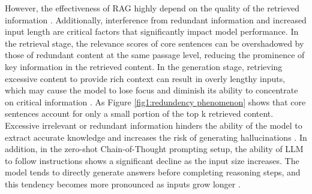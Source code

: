 However, the effectiveness of RAG highly depend on the quality of the retrieved information \cite{fan2024survey}. Additionally, interference from redundant information and increased input length are critical factors that significantly impact model performance.
In the retrieval stage, the relevance scores of core sentences can be overshadowed by those of redundant content at the same passage level, reducing the prominence of key information in the retrieved content. In the generation stage, retrieving excessive content to provide rich context can result in overly lengthy inputs, which may cause the model to lose focus and diminish its ability to concentrate on critical information \cite{jin2024longcontextllmsmeetrag, largelanguagemodelsCanbeEasilyDistractedbyInrelevantContext}. As Figure \ref{fig1:redundency phenomenon} shows that core sentences account for only a small portion of the top k retrieved content. Excessive irrelevant or redundant information hinders the ability of the model to extract accurate knowledge and increases the risk of generating hallucinations \cite{zhang2024raft, liu-etal-2024-lost}.
In addition, in the zero-shot Chain-of-Thought \cite{wei2022chain} prompting setup, the ability of LLM to follow instructions shows a significant decline as the input size increases. The model tends to directly generate answers before completing reasoning steps, and this tendency becomes more pronounced as inputs grow longer \cite{levy-etal-2024-task}. 


